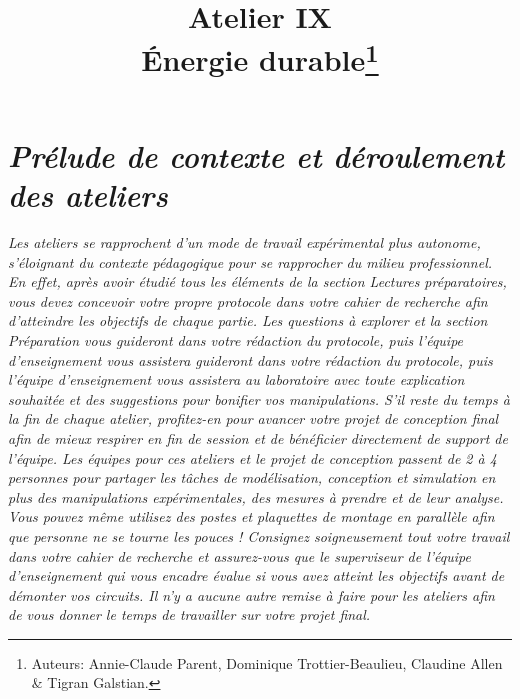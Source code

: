 \documentclass[canadien,12pt,oneside,letterpaper]{article}
\title{\textbf{Atelier IX}\\Énergie durable\thanks{Auteurs: Annie-Claude Parent, Dominique Trottier-Beaulieu, Claudine Allen \& Tigran Galstian.}}
\date{}
\begin{document}
\maketitle \vspace{-17ex}
\section{\textit{\textbf{Prélude de contexte et déroulement des ateliers}}}
\vspace{-2ex}
\textit{Les ateliers se rapprochent d’un mode de travail expérimental plus autonome,
s’éloignant du contexte pédagogique pour se rapprocher du milieu professionnel. En
effet, après avoir étudié tous les éléments de la section Lectures préparatoires, vous
devez concevoir votre propre protocole dans votre cahier de recherche afin d’atteindre
les objectifs de chaque partie. Les questions à explorer et la section Préparation vous
guideront dans votre rédaction du protocole, puis l’équipe d’enseignement vous assistera
guideront dans votre rédaction du protocole, puis l’équipe d’enseignement vous assistera
au laboratoire avec toute explication souhaitée et des suggestions pour bonifier
vos manipulations. S’il reste du temps à la fin de chaque atelier, profitez-en pour
avancer votre projet de conception final afin de mieux respirer en fin de session et
de bénéficier directement de support de l’équipe.
Les équipes pour ces ateliers et le projet de conception passent de 2 à 4 personnes
pour partager les tâches de modélisation, conception et simulation en plus des manipulations
expérimentales, des mesures à prendre et de leur analyse. Vous pouvez
même utilisez des postes et plaquettes de montage en parallèle afin que personne ne
se tourne les pouces ! Consignez soigneusement tout votre travail dans votre cahier
de recherche et assurez-vous que le superviseur de l’équipe d’enseignement qui vous
encadre évalue si vous avez atteint les objectifs avant de démonter vos circuits. Il
n’y a aucune autre remise à faire pour les ateliers afin de vous donner le temps de
travailler sur votre projet final.}
\end{document}

